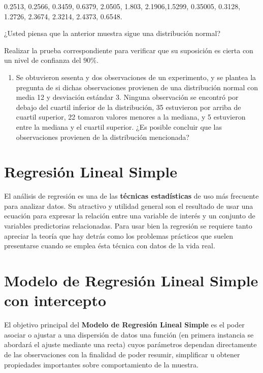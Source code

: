 \documentclass[a4paper,oneside,openany]{book}
\providecommand{\tightlist}{%
  \setlength{\itemsep}{0pt}\setlength{\parskip}{0pt}}
\begin{document}
0.2513, 0.2566, 0.3459, 0.6379, 2.0505, 1.803, 2.1906,1.5299, 0.35005,
0.3128, 1.2726, 2.3674, 2.3214, 2.4373, 0.6548.

¿Usted piensa que la anterior muestra sigue una distribución normal?

Realizar la prueba correspondiente para verificar que su suposición es
cierta con un nivel de confianza del \(90\%\).

\begin{enumerate}
\def\labelenumi{\arabic{enumi}.}
\setcounter{enumi}{2}
\tightlist
\item
  Se obtuvieron sesenta y dos observaciones de un experimento, y se
  plantea la pregunta de si dichas observaciones provienen de una
  distribución normal con media 12 y desviación estándar 3. Ninguna
  observación se encontró por debajo del cuartil inferior de la
  distribución, 35 estuvieron por arriba de cuartil superior, 22 tomaron
  valores menores a la mediana, y 5 estuvieron entre la mediana y el
  cuartil superior. ¿Es posible concluir que las observaciones provienen
  de la distribución mencionada?
\end{enumerate}

\chapter*{Regresión Lineal Simple}\label{regresiuxf3n-lineal-simple}


El análisis de regresión es una de las \textbf{técnicas estadísticas} de
uso más frecuente para analizar datos. Su atractivo y utilidad general
son el resultado de usar una ecuación para expresar la relación entre
una variable de interés y un conjunto de variables predictorias
relacionadas. Para usar bien la regresión se requiere tanto apreciar la
teoría que hay detrás como los problemas prácticos que suelen
presentarse cuando se emplea ésta técnica con datos de la vida real.

\chapter{Modelo de Regresión Lineal Simple con
intercepto}\label{modelo-de-regresiuxf3n-lineal-simple-con-intercepto}

El objetivo principal del \textbf{Modelo de Regresión Lineal Simple} es
el poder asociar o ajustar a una dispersión de datos una función (en
primera instancia se abordará el ajuste mediante una recta) cuyos
parámetros dependan directamente de las observaciones con la finalidad
de poder resumir, simplificar u obtener propiedades importantes sobre
comportamiento de la muestra.
\end{document}
